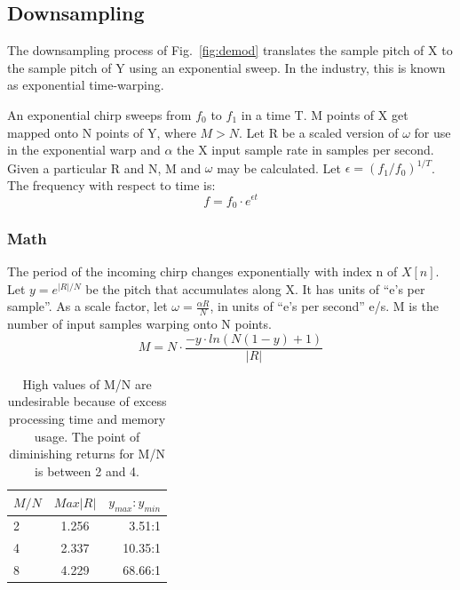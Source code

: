 \subsection{Downsampling}

The downsampling process of Fig.~\ref{fig:demod} translates the sample pitch of
X to the sample pitch of Y using an exponential sweep.
In the industry, this is known as exponential time-warping.

An exponential chirp sweeps from $f_0$ to $f_1$ in a time T.
M points of X get mapped onto N points of Y, where $M > N$.
Let R be a scaled version of $\omega$ for use in the exponential warp and
$\alpha$ the X input sample rate in samples per second.
Given a particular R and N, M and $\omega$ may be calculated.
Let $\epsilon = (f_1/f_0)^{1/T}$. The frequency with respect to time is:
\begin{equation}  \label{eq:fvsf0}
f = f_0 \cdot e^{\epsilon t}
\end{equation}

\subsubsection{Math}

The period of the incoming chirp changes exponentially with index n of $X[n]$.
Let $y = e^{|R|/N}$ be the pitch that accumulates along X.
It has units of ``e's per sample''.
As a scale factor, let $\omega = \frac{\alpha R}{N}$,
in units of ``e's per second'' e/s.
M is the number of input samples warping onto N points.
\begin{equation}  \label{eq:M_N}
M = N \cdot\frac{-y \cdot ln\left( N(1-y) + 1 \right)}{|R|}
\end{equation}

\begin{table}
	\label{tab:MNR}
	\caption{High values of M/N are undesirable because of excess processing
	time and memory usage.
    The point of diminishing returns for M/N is between 2 and 4.
    }
	\centering
	\begin{tabular}{lcr}
		\hline\hline
		$M/N$ & $Max |R|$ & $y_{max}:y_{min}$ \\ [0.5ex]
		\hline
		2 & 1.256 & 3.51:1\\
		4 & 2.337 & 10.35:1\\
		8 & 4.229 & 68.66:1\\
		\hline
	\end{tabular}
\end{table}

